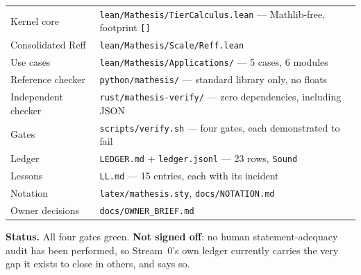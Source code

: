 \documentclass[11pt,a4paper]{article}
\begin{document}
\begin{center}\small
\begin{tabular}{@{}lp{8.4cm}@{}}
\toprule
Kernel core        & \texttt{lean/Mathesis/TierCalculus.lean} — Mathlib-free, footprint \texttt{[]} \\
Consolidated Reff  & \texttt{lean/Mathesis/Scale/Reff.lean} \\
Use cases          & \texttt{lean/Mathesis/Applications/} — 5 cases, 6 modules \\
Reference checker  & \texttt{python/mathesis/} — standard library only, no floats \\
Independent checker& \texttt{rust/mathesis-verify/} — zero dependencies, including JSON \\
Gates              & \texttt{scripts/verify.sh} — four gates, each demonstrated to fail \\
Ledger             & \texttt{LEDGER.md} + \texttt{ledger.jsonl} — 23 rows, \texttt{Sound} \\
Lessons            & \texttt{LL.md} — 15 entries, each with its incident \\
Notation           & \texttt{latex/mathesis.sty}, \texttt{docs/NOTATION.md} \\
Owner decisions    & \texttt{docs/OWNER_BRIEF.md} \\
\bottomrule
\end{tabular}
\end{center}

\vspace{0.6em}
\noindent\textbf{Status.} All four gates green. \textbf{Not signed off}: no human
statement-adequacy audit has been performed, so Stream~0's own ledger currently carries the very
gap it exists to close in others, and says so.
\end{document}
